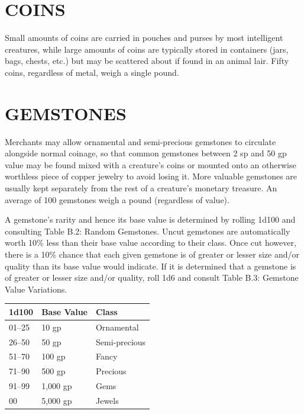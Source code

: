 \begin{multicols}{2}

\section{COINS}

Small amounts of coins are carried in pouches and purses by most intelligent creatures, while large amounts of coins are typically stored in containers (jars, bags, chests, etc.) but may be scattered about if found in an animal lair.  Fifty coins, regardless of metal, weigh a single pound.

\section{GEMSTONES}

Merchants may allow ornamental and semi-precious gemstones to circulate alongside normal coinage, so that common gemstones between 2 sp and 50 gp value may be found mixed with a creature's coins or mounted onto an otherwise worthless piece of copper jewelry to avoid losing it.  More valuable gemstones are usually kept separately from the rest of a creature's monetary treasure.  An average of 100 gemstones weigh a pound (regardless of value).

A gemstone's rarity and hence its base value is determined by rolling 1d100 and consulting Table B.2: Random Gemstones.  Uncut gemstones are automatically worth 10\% less than their base value according to their class.  Once cut however, there is a 10\% chance that each given gemstone is of greater or lesser size and/or quality than its base value would indicate.  If it is determined that a gemstone is of greater or lesser size and/or quality, roll 1d6 and consult Table B.3: Gemstone Value Variations.

\noindent
\begin{minipage}{\columnwidth}

\label{spellservices}
\noindent
\begin{tabular}{|p{}|p{}|p{}|}
\hline
1d100	& Base Value	& Class \\
\hline\hline
\rowcolor[gray]{.9}01--25	& 10 gp	& Ornamental \\
26--50	& 50 gp	& Semi-precious \\
\rowcolor[gray]{.9}51--70	& 100 gp	& Fancy \\
71--90	& 500 gp	& Precious \\
\rowcolor[gray]{.9}91--99	& 1,000 gp	& Gems \\
00	& 5,000 gp	& Jewels \\
\hline
\end{tabular}


\end{minipage}
\end{multicols}
